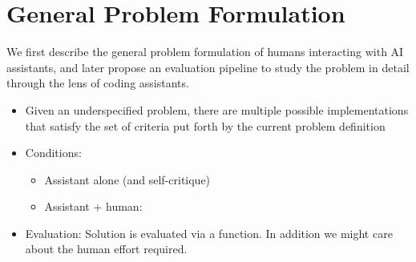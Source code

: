 
\section{General Problem Formulation}

We first describe the general problem formulation of humans interacting with AI assistants, and later propose an evaluation pipeline to study the problem in detail through the lens of coding assistants.

\begin{itemize}
    \item Given an underspecified problem, there are multiple possible implementations that satisfy the set of criteria put forth by the current problem definition
    \item Conditions:
    \begin{itemize}
        \item Assistant alone (and self-critique)
        \item Assistant + human: 
    \end{itemize}
    \item Evaluation: Solution is evaluated via a function. In addition we might care about the human effort required.
\end{itemize}